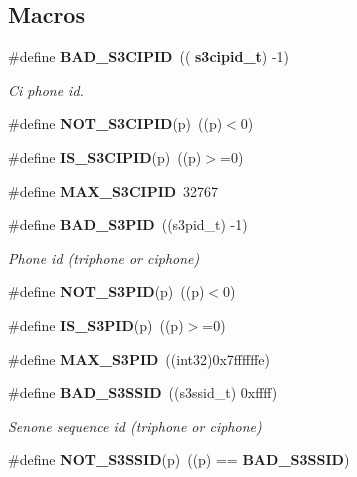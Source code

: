 \subsection*{Macros}
\begin{DoxyCompactItemize}
\item 
\mbox{\label{s3types_8h_af9c51863cdbb10d58b6aad21e896666b}} 
\#define \textbf{ B\+A\+D\+\_\+\+S3\+C\+I\+P\+ID}~((\textbf{ s3cipid\+\_\+t}) -\/1)
\begin{DoxyCompactList}\small\item\em Ci phone id. \end{DoxyCompactList}\item 
\mbox{\label{s3types_8h_ad7a2359e1e705906c58fe33f9729f6ce}} 
\#define {\bfseries N\+O\+T\+\_\+\+S3\+C\+I\+P\+ID}(p)~((p)$<$0)
\item 
\mbox{\label{s3types_8h_af719889a0db4f4f0b4b2ac9201bbe7cd}} 
\#define {\bfseries I\+S\+\_\+\+S3\+C\+I\+P\+ID}(p)~((p)$>$=0)
\item 
\mbox{\label{s3types_8h_a453101a056aef746b77e9768a1cb60a5}} 
\#define {\bfseries M\+A\+X\+\_\+\+S3\+C\+I\+P\+ID}~32767
\item 
\mbox{\label{s3types_8h_a4037acb07f1abc6c8a1aac0841556440}} 
\#define \textbf{ B\+A\+D\+\_\+\+S3\+P\+ID}~((s3pid\+\_\+t) -\/1)
\begin{DoxyCompactList}\small\item\em Phone id (triphone or ciphone) \end{DoxyCompactList}\item 
\mbox{\label{s3types_8h_ae3dad97c1cf3e6347c347bf633ee27dd}} 
\#define {\bfseries N\+O\+T\+\_\+\+S3\+P\+ID}(p)~((p)$<$0)
\item 
\mbox{\label{s3types_8h_afe39bcb2b878fb92ebd7b3e249304264}} 
\#define {\bfseries I\+S\+\_\+\+S3\+P\+ID}(p)~((p)$>$=0)
\item 
\mbox{\label{s3types_8h_a1141ddc85d582a6e1a1c70609baab281}} 
\#define {\bfseries M\+A\+X\+\_\+\+S3\+P\+ID}~((int32)0x7ffffffe)
\item 
\mbox{\label{s3types_8h_ade0bee313d69b3d324b5622fa0507ec7}} 
\#define \textbf{ B\+A\+D\+\_\+\+S3\+S\+S\+ID}~((s3ssid\+\_\+t) 0xffff)
\begin{DoxyCompactList}\small\item\em Senone sequence id (triphone or ciphone) \end{DoxyCompactList}\item 
\mbox{\label{s3types_8h_a970be643bdeb0467b4bab2395d76293b}} 
\#define {\bfseries N\+O\+T\+\_\+\+S3\+S\+S\+ID}(p)~((p) == \textbf{ B\+A\+D\+\_\+\+S3\+S\+S\+ID})

\end{DoxyCompactItemize}
